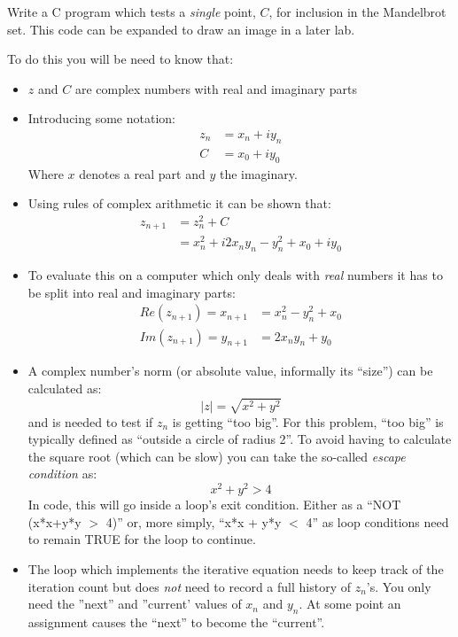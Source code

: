 \documentclass{lab}
\begin{document}
\begin{task}{}{} Write a C program which tests a \textit{single} point, $C$, for inclusion in the Mandelbrot set. This code can be expanded to draw an image in a later lab.
\end{task}

To do this you will be need to know that:
\begin{itemize}[itemsep=0mm]
\item $z$ and $C$ are complex numbers with real and imaginary parts

\item Introducing some notation:
\begin{align}
z_n &= x_n + iy_n \\
C &= x_0 + iy_0
\end{align}
Where $x$ denotes a real part and $y$ the imaginary.
\item Using rules of complex arithmetic it can be shown that:
\begin{align}
z_{n+1} &= z^2_{n} + C \\
&= x^2_n + i2x_ny_n - y^2_n + x_0 + iy_0
\end{align}
\item To evaluate this on a computer which only deals with \textit{real} numbers it has to be split into real and imaginary parts:
\begin{align}
Re(z_{n+1}) = x_{n+1} &= x^2_n - y^2_n + x_0\\
Im(z_{n+1}) = y_{n+1} &= 2x_ny_n + y_0
\end{align}
\item A complex number's norm (or absolute value, informally its ``size'') can be calculated as:
\begin{equation}
\left|z\right| = \sqrt{x^2 + y^2}
\end{equation}
and is needed to test if $z_n$ is getting ``too big''. For this problem, ``too big'' is typically defined as ``outside a circle of radius 2''. To avoid having to calculate the square root (which can be slow) you can take the so-called \textit{escape condition} as:
\begin{equation}
x^2 + y^2 > 4
\end{equation}
In code, this will go inside a loop's exit condition. Either as a ``NOT (x*x+y*y $>$ 4)'' or, more simply, ``x*x + y*y $<$ 4'' as loop conditions need to remain TRUE for the loop to continue.
\item The loop which implements the iterative equation needs to keep track of the iteration count but does \textit{not} need to record a full history of $z_n$'s. You only need the ''next'' and ''current' values of $x_n$ and $y_n$. At some point an assignment causes the ``next'' to become the ``current''.

\end{itemize}
\end{document}
